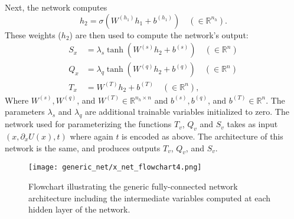 \documentclass[../main.tex]{subfiles}
\begin{document}
%
Next, the network computes
%
\begin{equation}
    h_2 = \sigma\left(W^{(h_1)} h_1 + b^{(h_1)}\right) \quad (\in
    \mathbb{R}^{n_h}).
    \label{eq:hidden_2}
\end{equation}
%
These weights ($h_2$) are then used to compute the network's output:
%
\begin{align}
    S_x &= \lambda_s \tanh(W^{(s)} h_2 + b^{(s)})\quad (\in \mathbb{R}^{n})\\
    Q_x &= \lambda_q \tanh(W^{(q)} h_2 + b^{(q)})\quad (\in \mathbb{R}^{n})\\
    T_x &= W^{(T)} h_2 + b^{(T)}\quad (\in \mathbb{R}^{n}),
\end{align}
%
Where $W^{(s)}, W^{(q)}$, and $W^{(T)} \in \mathbb{R}^{n_h \times n}$ and $b^{(s)}, b^{(q)}$, and $b^{(T)} \in
\mathbb{R}^{n}$.
%
The parameters $\lambda_s$ and $\lambda_q$ are additional trainable variables initialized to zero.
%
The network used for parameterizing the functions $T_v$, $Q_v$ and $S_v$ takes as input $(x, \partial_x U(x), t)$ where
again $t$ is encoded as above.  The architecture of this network is the same, and produces outputs $T_v$, $Q_v$, and
$S_v$.

\begin{figure}[htpb]
  \centering
  \texttt{[image: generic\_net/x\_net\_flowchart4.png]}
  \caption{Flowchart illustrating the generic fully-connected network architecture including the intermediate variables
  computed at each hidden layer of the network.}%
\label{fig:x_net_flowchart}
\end{figure}

%
\end{document}

